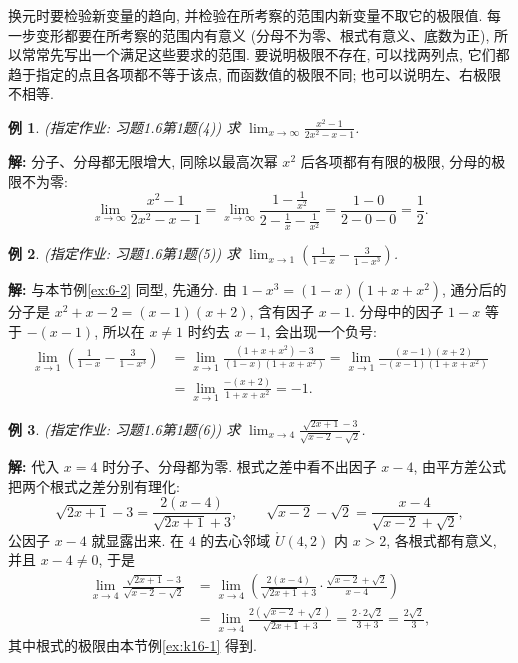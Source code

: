 \documentclass[UTF8,openany]{ctexbook}
\theoremstyle{chinesetextbook}
\newtheorem{example}{例}[section]
\newenvironment{cnsolution}{\par\indent\textbf{解:} \ignorespaces}{\par}
\begin{document}
换元时要检验新变量的趋向, 并检验在所考察的范围内新变量不取它的极限值. 每一步变形都要在所考察的范围内有意义 (分母不为零、根式有意义、底数为正), 所以常常先写出一个满足这些要求的范围. 要说明极限不存在, 可以找两列点, 它们都趋于指定的点且各项都不等于该点, 而函数值的极限不同; 也可以说明左、右极限不相等.
\begin{example}
\textnormal{(指定作业: 习题1.6第1题(4))} 求 $\displaystyle\lim_{x\to\infty}\frac{x^2-1}{2x^2-x-1}$.
\end{example}
\begin{cnsolution}
分子、分母都无限增大, 同除以最高次幂 $x^2$ 后各项都有有限的极限, 分母的极限不为零:
\[
\lim_{x\to\infty}\frac{x^2-1}{2x^2-x-1}=\lim_{x\to\infty}\frac{1-\frac1{x^2}}{2-\frac1x-\frac1{x^2}}=\frac{1-0}{2-0-0}=\frac12.
\]
\end{cnsolution}
\begin{example}
\textnormal{(指定作业: 习题1.6第1题(5))} 求 $\displaystyle\lim_{x\to1}\left(\frac1{1-x}-\frac3{1-x^3}\right)$.
\end{example}
\begin{cnsolution}
与本节例\ref{ex:6-2} 同型, 先通分. 由 $1-x^3=(1-x)(1+x+x^2)$, 通分后的分子是 $x^2+x-2=(x-1)(x+2)$, 含有因子 $x-1$. 分母中的因子 $1-x$ 等于 $-(x-1)$, 所以在 $x\ne1$ 时约去 $x-1$, 会出现一个负号:
\[
\begin{aligned}
\lim_{x\to1}\left(\frac1{1-x}-\frac3{1-x^3}\right)
&=\lim_{x\to1}\frac{(1+x+x^2)-3}{(1-x)(1+x+x^2)}=\lim_{x\to1}\frac{(x-1)(x+2)}{-(x-1)(1+x+x^2)}\\
&=\lim_{x\to1}\frac{-(x+2)}{1+x+x^2}=-1.
\end{aligned}
\]
\end{cnsolution}
\begin{example}
\textnormal{(指定作业: 习题1.6第1题(6))} 求 $\displaystyle\lim_{x\to4}\frac{\sqrt{2x+1}-3}{\sqrt{x-2}-\sqrt2}$.
\end{example}
\begin{cnsolution}
代入 $x=4$ 时分子、分母都为零. 根式之差中看不出因子 $x-4$, 由平方差公式把两个根式之差分别有理化:
\[
\sqrt{2x+1}-3=\frac{2(x-4)}{\sqrt{2x+1}+3},\qquad\sqrt{x-2}-\sqrt2=\frac{x-4}{\sqrt{x-2}+\sqrt2},
\]
公因子 $x-4$ 就显露出来. 在 $4$ 的去心邻域 $\mathring U(4,2)$ 内 $x>2$, 各根式都有意义, 并且 $x-4\ne0$, 于是
\[
\begin{aligned}
\lim_{x\to4}\frac{\sqrt{2x+1}-3}{\sqrt{x-2}-\sqrt2}
&=\lim_{x\to4}\left(\frac{2(x-4)}{\sqrt{2x+1}+3}\cdot\frac{\sqrt{x-2}+\sqrt2}{x-4}\right)\\
&=\lim_{x\to4}\frac{2\left(\sqrt{x-2}+\sqrt2\right)}{\sqrt{2x+1}+3}=\frac{2\cdot2\sqrt2}{3+3}=\frac{2\sqrt2}3,
\end{aligned}
\]
其中根式的极限由本节例\ref{ex:k16-1} 得到.
\end{cnsolution}
\end{document}

